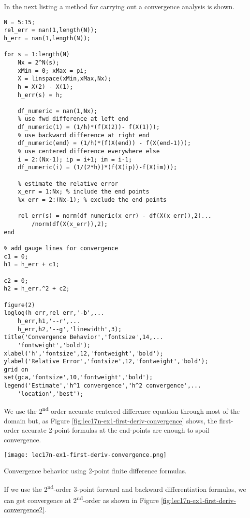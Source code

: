 In the next listing a method for carrying out a convergence analysis is shown.
\begin{lstlisting}[style=myMatlab,name=lec17n-ex1]
%% Get Convergence Rate
N = 5:15;
rel_err = nan(1,length(N));
h_err = nan(1,length(N));

for s = 1:length(N)
    Nx = 2^N(s);
    xMin = 0; xMax = pi;
    X = linspace(xMin,xMax,Nx);
    h = X(2) - X(1);
    h_err(s) = h;
    
    df_numeric = nan(1,Nx);
    % use fwd difference at left end
    df_numeric(1) = (1/h)*(f(X(2))- f(X(1)));
    % use backward difference at right end
    df_numeric(end) = (1/h)*(f(X(end)) - f(X(end-1)));
    % use centered difference everywhere else
    i = 2:(Nx-1); ip = i+1; im = i-1;
    df_numeric(i) = (1/(2*h))*(f(X(ip))-f(X(im)));
    
    % estimate the relative error
    x_err = 1:Nx; % include the end points
    %x_err = 2:(Nx-1); % exclude the end points
   
    rel_err(s) = norm(df_numeric(x_err) - df(X(x_err)),2)...
        /norm(df(X(x_err)),2);    
end

% add gauge lines for convergence
c1 = 0;
h1 = h_err + c1;

c2 = 0;
h2 = h_err.^2 + c2;

figure(2)
loglog(h_err,rel_err,'-b',...
    h_err,h1,'--r',...
    h_err,h2,'--g','linewidth',3);
title('Convergence Behavior','fontsize',14,...
    'fontweight','bold');
xlabel('h','fontsize',12,'fontweight','bold');
ylabel('Relative Error','fontsize',12,'fontweight','bold');
grid on
set(gca,'fontsize',10,'fontweight','bold');
legend('Estimate','h^1 convergence','h^2 convergence',...
    'location','best');
\end{lstlisting}
We use the 2\textsuperscript{nd}-order accurate centered difference equation through most of the domain but, as Figure \ref{fig:lec17n-ex1-first-deriv-convergence} shows, the first-order accurate 2-point formulas at the end-points are enough to spoil convergence.

\begin{marginfigure}[-10.0cm]
\texttt{[image: lec17n-ex1-first-deriv-convergence.png]}
\caption{Convergence behavior using 2-point finite difference formulas.}
\label{fig:lec17n-ex1-first-deriv-convergence}
\end{marginfigure}

If we use the 2\textsuperscript{nd}-order 3-point forward and backward differentiation formulas, we can get convergence at 2\textsuperscript{nd}-order as shown in Figure \ref{fig:lec17n-ex1-first-deriv-convergence2}.

